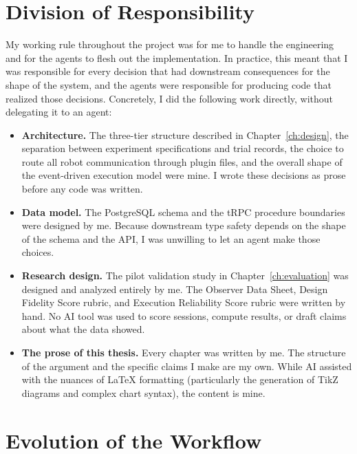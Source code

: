 \section{Division of Responsibility}
\label{sec:ai-division}

My working rule throughout the project was for me to handle the engineering and for the agents to flesh out the implementation. In practice, this meant that I was responsible for every decision that had downstream consequences for the shape of the system, and the agents were responsible for producing code that realized those decisions. Concretely, I did the following work directly, without delegating it to an agent:

\begin{itemize}
\item \textbf{Architecture.} The three-tier structure described in Chapter~\ref{ch:design}, the separation between experiment specifications and trial records, the choice to route all robot communication through plugin files, and the overall shape of the event-driven execution model were mine. I wrote these decisions as prose before any code was written.

\item \textbf{Data model.} The PostgreSQL schema and the tRPC procedure boundaries were designed by me. Because downstream type safety depends on the shape of the schema and the API, I was unwilling to let an agent make those choices.

\item \textbf{Research design.} The pilot validation study in Chapter~\ref{ch:evaluation} was designed and analyzed entirely by me. The Observer Data Sheet, Design Fidelity Score rubric, and Execution Reliability Score rubric were written by hand. No AI tool was used to score sessions, compute results, or draft claims about what the data showed.

\item \textbf{The prose of this thesis.} Every chapter was written by me. The structure of the argument and the specific claims I make are my own. While AI assisted with the nuances of \LaTeX{} formatting (particularly the generation of TikZ diagrams and complex chart syntax), the content is mine.
\end{itemize}

\section{Evolution of the Workflow}
\label{sec:ai-pattern}

